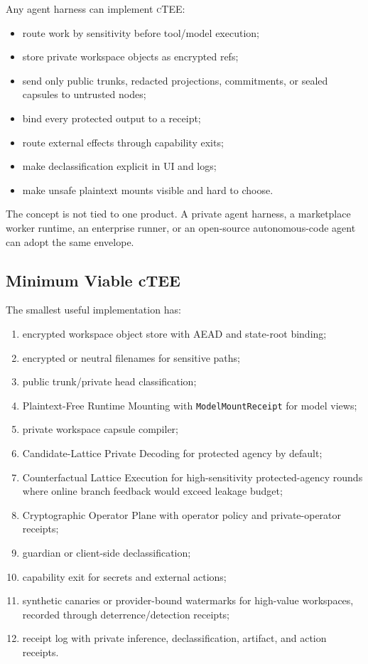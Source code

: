 \documentclass[11pt]{article}
\newcommand{\ctee}{\textnormal{\textsc{cTEE}}}
\newcommand{\code}[1]{\texttt{#1}}
\begin{document}
Any agent harness can implement \ctee{}:

\begin{itemize}[leftmargin=1.5em]
\item route work by sensitivity before tool/model execution;
\item store private workspace objects as encrypted refs;
\item send only public trunks, redacted projections, commitments, or sealed
capsules to untrusted nodes;
\item bind every protected output to a receipt;
\item route external effects through capability exits;
\item make declassification explicit in UI and logs;
\item make unsafe plaintext mounts visible and hard to choose.
\end{itemize}

The concept is not tied to one product. A private agent harness, a marketplace
worker runtime, an enterprise runner, or an open-source autonomous-code agent
can adopt the same envelope.

\subsection{Minimum Viable cTEE}

The smallest useful implementation has:

\begin{enumerate}[leftmargin=1.5em]
\item encrypted workspace object store with AEAD and state-root binding;
\item encrypted or neutral filenames for sensitive paths;
\item public trunk/private head classification;
\item Plaintext-Free Runtime Mounting with \code{ModelMountReceipt} for model
views;
\item private workspace capsule compiler;
\item Candidate-Lattice Private Decoding for protected agency by default;
\item Counterfactual Lattice Execution for high-sensitivity protected-agency
rounds where online branch feedback would exceed leakage budget;
\item Cryptographic Operator Plane with operator policy and private-operator
receipts;
\item guardian or client-side declassification;
\item capability exit for secrets and external actions;
\item synthetic canaries or provider-bound watermarks for high-value
workspaces, recorded through deterrence/detection receipts;
\item receipt log with private inference, declassification, artifact, and
action receipts.
\end{enumerate}
\end{document}
